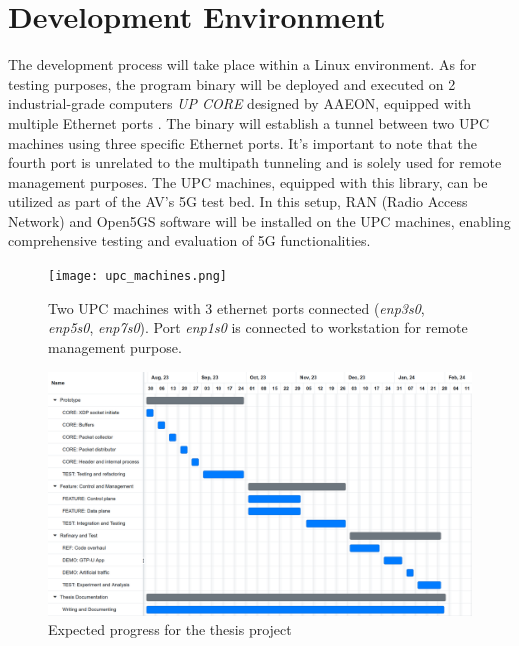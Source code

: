 \section{Development Environment}
The development process will take place within a Linux environment. 
As for testing purposes, the program binary will be deployed and executed on 2 industrial-grade computers \textit{UP CORE} designed by \ac{AAEON}, equipped with multiple Ethernet ports \cite{upc_core} \cite{upc_extension_board}. 
The binary will establish a tunnel between two UPC machines using three specific Ethernet ports. 
It's important to note that the fourth port is unrelated to the multipath tunneling and is solely used for remote management purposes.
The UPC machines, equipped with this library, can be utilized as part of the AV's 5G test bed. 
In this setup, RAN (Radio Access Network) and Open5GS software will be installed on the UPC machines, enabling comprehensive testing and evaluation of 5G functionalities.

\begin{figure}[H]
	\centering
	\texttt{[image: upc\_machines.png]}
	\caption{Two UPC machines with 3 ethernet ports connected (\textit{enp3s0}, \textit{enp5s0}, \textit{enp7s0}). Port \textit{enp1s0} is connected to workstation for remote management purpose.}
	\label{fig:plan:upc_machines}
\end{figure}


\clearpage
\begin{figure}
    \centering
    \includegraphics[width=1.0\textwidth]{resources/images/TIMELINE.PNG}
    \caption{Expected progress for the thesis project}
	\label{fig:plan:TIMELINE}
  \end{figure}